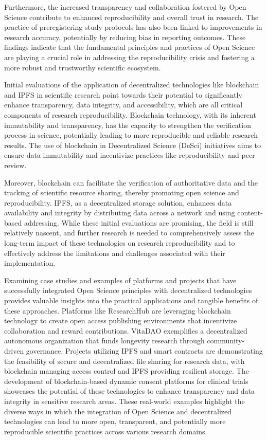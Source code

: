 \documentclass{article}
\begin{document}
Furthermore, the increased transparency and collaboration fostered by Open Science contribute to enhanced reproducibility and overall trust in research. The practice of preregistering study protocols has also been linked to improvements in research accuracy, potentially by reducing bias in reporting outcomes. These findings indicate that the fundamental principles and practices of Open Science are playing a crucial role in addressing the reproducibility crisis and fostering a more robust and trustworthy scientific ecosystem.

Initial evaluations of the application of decentralized technologies like blockchain and IPFS in scientific research point towards their potential to significantly enhance transparency, data integrity, and accessibility, which are all critical components of research reproducibility. Blockchain technology, with its inherent immutability and transparency, has the capacity to strengthen the verification process in science, potentially leading to more reproducible and reliable research results. The use of blockchain in Decentralized Science (DeSci) initiatives aims to ensure data immutability and incentivize practices like reproducibility and peer review.

Moreover, blockchain can facilitate the verification of authoritative data and the tracking of scientific resource sharing, thereby promoting open science and reproducibility. IPFS, as a decentralized storage solution, enhances data availability and integrity by distributing data across a network and using content-based addressing. While these initial evaluations are promising, the field is still relatively nascent, and further research is needed to comprehensively assess the long-term impact of these technologies on research reproducibility and to effectively address the limitations and challenges associated with their implementation.

Examining case studies and examples of platforms and projects that have successfully integrated Open Science principles with decentralized technologies provides valuable insights into the practical applications and tangible benefits of these approaches. Platforms like ResearchHub are leveraging blockchain technology to create open access publishing environments that incentivize collaboration and reward contributions. VitaDAO exemplifies a decentralized autonomous organization that funds longevity research through community-driven governance. Projects utilizing IPFS and smart contracts are demonstrating the feasibility of secure and decentralized file sharing for research data, with blockchain managing access control and IPFS providing resilient storage. The development of blockchain-based dynamic consent platforms for clinical trials showcases the potential of these technologies to enhance transparency and data integrity in sensitive research areas. These real-world examples highlight the diverse ways in which the integration of Open Science and decentralized technologies can lead to more open, transparent, and potentially more reproducible scientific practices across various research domains.
\end{document}
